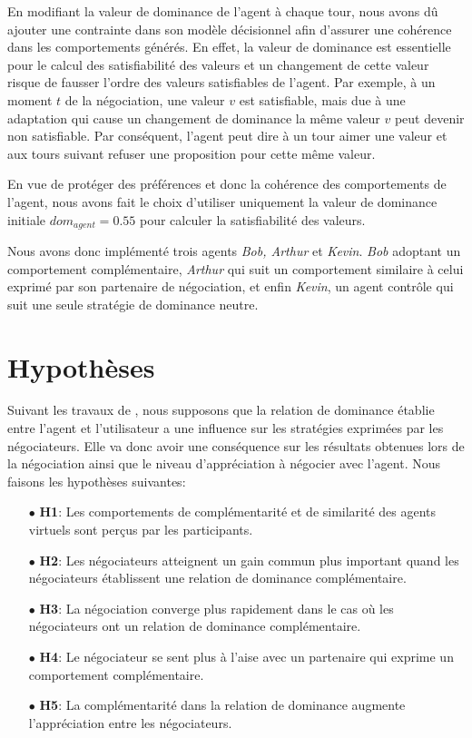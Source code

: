 En modifiant la valeur de dominance de l'agent à chaque tour, nous avons dû ajouter une contrainte dans son modèle décisionnel afin d'assurer une cohérence dans les comportements générés. 
En effet, la valeur de dominance est essentielle pour le calcul des satisfiabilité des valeurs et un changement de cette valeur risque de fausser l'ordre des valeurs satisfiables de l'agent.
Par exemple, à un moment $t$ de la négociation, une valeur $v$ est satisfiable, mais due à une adaptation qui cause un changement de dominance la même valeur $v$ peut devenir non satisfiable. Par conséquent, l'agent peut dire à un tour aimer une valeur et aux tours suivant refuser une proposition pour cette même valeur.

En vue de protéger des préférences et donc la cohérence des comportements de l'agent, nous avons fait le choix d'utiliser uniquement la valeur de dominance initiale $dom_{agent} = 0.55$ pour calculer la satisfiabilité des valeurs.

Nous avons donc implémenté trois agents \emph{Bob, Arthur} et \emph{Kevin}. \emph{Bob} adoptant un comportement complémentaire, \emph{Arthur} qui suit un comportement similaire à celui exprimé par son partenaire de négociation, et enfin \emph{Kevin}, un agent contrôle qui suit une seule stratégie de dominance neutre. 

\section{Hypothèses}
\label{sec:H}

Suivant les travaux de \cite{tiedens2003power,dryer1997opposites,wiltermuth2015benefits}, nous supposons que la relation de dominance établie entre l'agent et l'utilisateur a une influence sur les stratégies exprimées par les négociateurs. Elle va donc avoir une conséquence sur les résultats obtenues lors de la négociation ainsi que le niveau d'appréciation à négocier avec l'agent.
Nous faisons les hypothèses suivantes: 
\begin{itemize}
	\item [$\bullet$] \textbf{H1}: Les comportements de complémentarité et de similarité des agents virtuels sont perçus par les participants.
	\item [$\bullet$] \textbf{H2}: Les négociateurs atteignent un gain commun plus important quand les négociateurs établissent une relation de dominance complémentaire.
	\item [$\bullet$] \textbf{H3}: La négociation converge plus rapidement dans le cas où les négociateurs ont un relation de dominance complémentaire. 
	\item [$\bullet$] \textbf{H4}: Le négociateur se sent plus à l'aise avec un partenaire qui exprime un comportement complémentaire.
	\item [$\bullet$] \textbf{H5}: La complémentarité dans la relation de dominance augmente l'appréciation entre les négociateurs.
\end{itemize}




